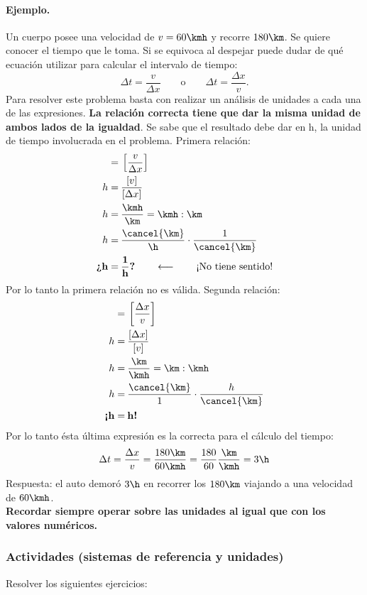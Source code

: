 \paragraph{Ejemplo.} 
Un cuerpo posee una velocidad de $v=60\kmh$ y recorre $180\km$. Se quiere
conocer el tiempo que le toma. Si se equivoca al despejar puede dudar de qué
ecuación utilizar para calcular el intervalo de tiempo:
$$
\Delta t = \dfrac{v}{\Delta x}\qquad \text{o} \qquad \Delta t = \dfrac{\Delta
x}{v}.
$$
Para resolver este problema basta con realizar un análisis de unidades a cada
una de las expresiones. {\bf La relación correcta tiene que dar la misma unidad
de ambos lados de la igualdad}. Se sabe que el resultado debe dar en h, la
unidad de tiempo involucrada en el problema. Primera relación:
\begin{align*}
  [\Delta t] = &\: \left[\dfrac{v}{\Delta x}\right] \\
  h = &\: \dfrac{[v]}{[\Delta x]} \\
  h = &\: \dfrac{\kmh}{\km} = \kmh : \km \\
  h = &\: \dfrac{\cancel{\km}}{\h} \cdot \dfrac{1}{\cancel{\km}} \\
  \textbf{¿}\mathbf{h =} &\: \mathbf{\dfrac{1}{h}}\textbf{?} \qquad
  \longleftarrow \qquad \text{¡No tiene sentido!}
\end{align*}
Por lo tanto la primera relación no es válida. Segunda relación:
\begin{align*}
  [\Delta t] = &\: \left[\dfrac{\Delta x}{v}\right] \\
  h = &\: \dfrac{[\Delta x]}{[v]} \\
  h = &\: \dfrac{\km}{\kmh} = \km : \kmh \\
  h = &\: \dfrac{\cancel{\km}}{1} \cdot \dfrac{h}{\cancel{\km}} \\
  \textbf{¡}\mathbf{h =} &\: \mathbf{h}\textbf{!}
\end{align*}
Por lo tanto ésta última expresión es la correcta para el cálculo del tiempo:
$$
\Delta t = \dfrac{\Delta x}{v} = \dfrac{180\km}{60\kmh} =
\dfrac{180}{60}\dfrac{\km}{\kmh} = 3\h
$$
Respuesta: el auto demoró $3\h$ en recorrer los $180\km$ viajando a una
velocidad de $60\kmh$. \finej \\

{\bf Recordar siempre operar sobre las unidades al igual que con los valores
numéricos.}


\subsubsection*{Actividades (sistemas de referencia y unidades)}
\small
Resolver los siguientes ejercicios:

